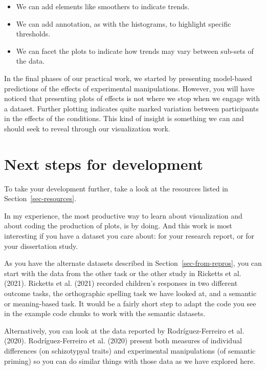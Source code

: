 \documentclass[
  letterpaper,
  DIV=11,
  numbers=noendperiod]{scrreprt}
\providecommand{\tightlist}{%
  \setlength{\itemsep}{0pt}\setlength{\parskip}{0pt}}\usepackage{longtable,booktabs,array}
\begin{document}
\begin{itemize}
\tightlist
\item
  We can add elements like smoothers to indicate trends.
\item
  We can add annotation, as with the histograms, to highlight specific
  thresholds.
\item
  We can facet the plots to indicate how trends may vary between
  sub-sets of the data.
\end{itemize}

In the final phases of our practical work, we started by presenting
model-based predictions of the effects of experimental manipulations.
However, you will have noticed that presenting plots of effects is not
where we stop when we engage with a dataset. Further plotting indicates
quite marked variation between participants in the effects of the
conditions. This kind of insight is something we can and should seek to
reveal through our visualization work.

\hypertarget{next-steps-for-development}{%
\section{Next steps for development}\label{next-steps-for-development}}

To take your development further, take a look at the resources listed in
Section~\ref{sec-resources}.

In my experience, the most productive way to learn about visualization
and about coding the production of plots, is by doing. And this work is
most interesting if you have a dataset you care about: for your research
report, or for your dissertation study.

As you have the alternate datasets described in
Section~\ref{sec-from-repros}, you can start with the data from the
other task or the other study in Ricketts et al. (2021). Ricketts et al.
(2021) recorded children's responses in two different outcome tasks, the
orthographic spelling task we have looked at, and a semantic or
meaning-based task. It would be a fairly short step to adapt the code
you see in the example code chunks to work with the semantic datasets.

Alternatively, you can look at the data reported by Rodríguez-Ferreiro
et al. (2020). Rodríguez-Ferreiro et al. (2020) present both measures of
individual differences (on schizotypyal traits) and experimental
manipulations (of semantic priming) so you can do similar things with
those data as we have explored here.
\end{document}
